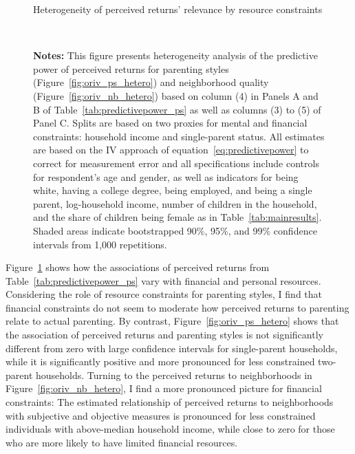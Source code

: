 \documentclass[12pt, a4paper, english]{article}
\begin{document}
\begin{figure}[h!]\centering
    \caption{Heterogeneity of perceived returns' relevance by resource constraints}\label{fig:oriv_hetero}
     \\
    \caption*{\footnotesize \textbf{Notes:} This figure presents heterogeneity analysis of the predictive power of perceived returns for parenting styles (Figure~\ref{fig:oriv_ps_hetero}) and neighborhood quality (Figure~\ref{fig:oriv_nb_hetero}) based on column (4) in Panels A and B of Table~\ref{tab:predictivepower_ps} as well as columns (3) to (5) of Panel C. Splits are based on two proxies for mental and financial constraints: household income and single-parent status. All estimates are based on the IV approach of equation~\eqref{eq:predictivepower} to correct for measurement error and all specifications include controls for respondent's age and gender, as well as indicators for being white, having a college degree, being employed, and being a single parent, log-household income, number of children in the household, and the share of children being female as in Table~\ref{tab:mainresults}. Shaded areas indicate bootstrapped 90\%, 95\%, and 99\% confidence intervals from 1,000 repetitions.}
\end{figure}

Figure~\ref{fig:oriv_hetero} shows how the associations of perceived returns from Table~\ref{tab:predictivepower_ps} vary with financial and personal resources. Considering the role of resource constraints for parenting styles, I find that financial constraints do not seem to moderate how perceived returns to parenting relate to actual parenting. By contrast, Figure~\ref{fig:oriv_ps_hetero} shows that the association of perceived returns and parenting styles is not significantly different from zero with large confidence intervals for single-parent households, while it is significantly positive and more pronounced for less constrained two-parent households. Turning to the perceived returns to neighborhoods in Figure~\ref{fig:oriv_nb_hetero}, I find a more pronounced picture for financial constraints: The estimated relationship of perceived returns to neighborhoods with subjective and objective measures is pronounced for less constrained individuals with above-median household income, while close to zero for those who are more likely to have limited financial resources.
\end{document}
